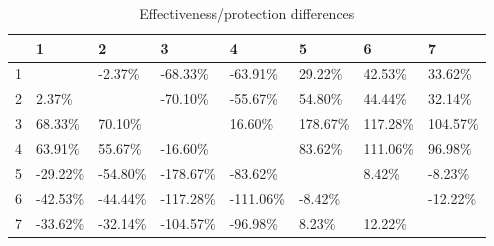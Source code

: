 \begin{table}[ht]
\centering
\begin{tabular}{rlllllll}
  \hline
 & 1 & 2 & 3 & 4 & 5 & 6 & 7 \\ 
  \hline
1 &  & -2.37\% & -68.33\% & -63.91\% & 29.22\% & 42.53\% & 33.62\% \\ 
  2 & 2.37\% &  & -70.10\% & -55.67\% & 54.80\% & 44.44\% & 32.14\% \\ 
  3 & 68.33\% & 70.10\% &  & 16.60\% & 178.67\% & 117.28\% & 104.57\% \\ 
  4 & 63.91\% & 55.67\% & -16.60\% &  & 83.62\% & 111.06\% & 96.98\% \\ 
  5 & -29.22\% & -54.80\% & -178.67\% & -83.62\% &  & 8.42\% & -8.23\% \\ 
  6 & -42.53\% & -44.44\% & -117.28\% & -111.06\% & -8.42\% &  & -12.22\% \\ 
  7 & -33.62\% & -32.14\% & -104.57\% & -96.98\% & 8.23\% & 12.22\% &  \\ 
   \hline
\end{tabular}
\caption{Effectiveness/protection differences} 
\end{table}
